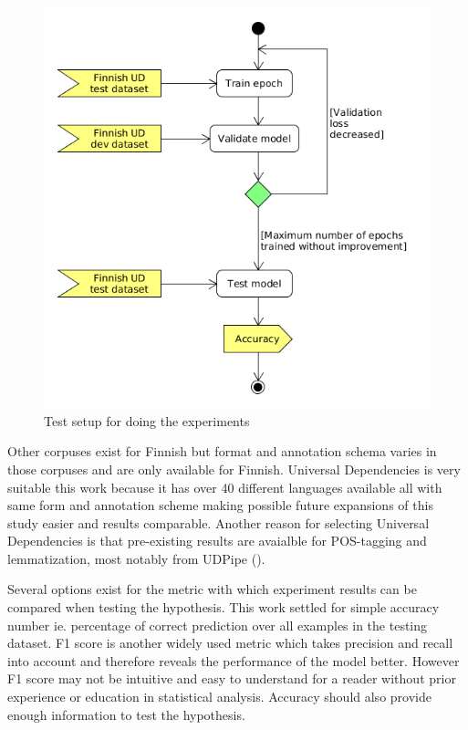 \documentclass[12pt,a4paper,english
]{tutthesis}
\begin{document}
\begin{figure}[htbp]
\caption{Test setup for doing the experiments}
\label{figure:test_setup}
\centering
\includegraphics[width=15cm]{test_setup.png}
\end{figure}

Other corpuses exist for Finnish but format and annotation schema varies in those corpuses and are only available for Finnish. Universal Dependencies is very suitable this work because it has over 40 different languages available all with same form and annotation scheme making possible future expansions of this study easier and results comparable. Another reason for selecting Universal Dependencies is that pre-existing results are avaialble for POS-tagging and lemmatization, most notably from UDPipe (\cite{Straka2017}).

Several options exist for the metric with which experiment results can be compared when testing the hypothesis. This work settled for simple accuracy number ie. percentage of correct prediction over all examples in the testing dataset. F1 score is another widely used metric which takes precision and recall into account and therefore reveals the performance of the model better. However F1 score may not be intuitive and easy to understand for a reader without prior experience or education in statistical analysis. Accuracy should also provide enough information to test the hypothesis.
\end{document}
